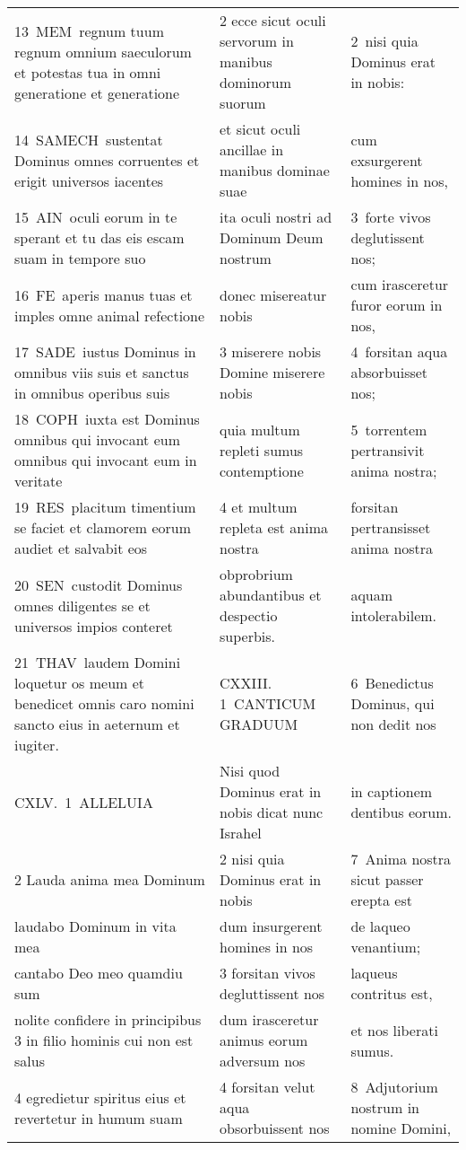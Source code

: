 \documentclass{article}
\begin{document}
\begin{longtable}{@{}p{}p{}p{}@{}}
13 MEM regnum tuum regnum omnium saeculorum et potestas tua in omni generatione et generatione	&	2 ecce sicut oculi servorum in manibus dominorum suorum	&	2 nisi quia Dominus erat in nobis:	\\
14 SAMECH sustentat Dominus omnes corruentes et erigit universos iacentes	&	et sicut oculi ancillae in manibus dominae suae	&	cum exsurgerent homines in nos,	\\
15 AIN oculi eorum in te sperant et tu das eis escam suam in tempore suo	&	ita oculi nostri ad Dominum Deum nostrum	&	3 forte vivos deglutissent nos;	\\
16 FE aperis manus tuas et imples omne animal refectione	&	donec misereatur nobis	&	cum irasceretur furor eorum in nos,	\\
17 SADE iustus Dominus in omnibus viis suis et sanctus in omnibus operibus suis	&	3 miserere nobis Domine miserere nobis	&	4 forsitan aqua absorbuisset nos;	\\
18 COPH iuxta est Dominus omnibus qui invocant eum omnibus qui invocant eum in veritate	&	quia multum repleti sumus contemptione	&	5 torrentem pertransivit anima nostra;	\\
19 RES placitum timentium se faciet et clamorem eorum audiet et salvabit eos	&	4 et multum repleta est anima nostra	&	forsitan pertransisset anima nostra	\\
20 SEN custodit Dominus omnes diligentes se et universos impios conteret	&	obprobrium abundantibus et despectio superbis.	&	aquam intolerabilem.	\\
21 THAV laudem Domini loquetur os meum et benedicet omnis caro nomini sancto eius in aeternum et iugiter.	&	CXXIII. 1 CANTICUM GRADUUM	&	6 Benedictus Dominus, qui non dedit nos	\\
CXLV. 1 ALLELUIA	&	Nisi quod Dominus erat in nobis dicat nunc Israhel	&	in captionem dentibus eorum.	\\
2 Lauda anima mea Dominum	&	2 nisi quia Dominus erat in nobis	&	7 Anima nostra sicut passer erepta est	\\
laudabo Dominum in vita mea	&	dum insurgerent homines in nos	&	de laqueo venantium;	\\
cantabo Deo meo quamdiu sum	&	3 forsitan vivos degluttissent nos	&	laqueus contritus est,	\\
nolite confidere in principibus 3 in filio hominis cui non est salus	&	dum irasceretur animus eorum adversum nos	&	et nos liberati sumus.	\\
4 egredietur spiritus eius et revertetur in humum suam	&	4 forsitan velut aqua obsorbuissent nos	&	8 Adjutorium nostrum in nomine Domini,	\\

\end{longtable}
\end{document}
